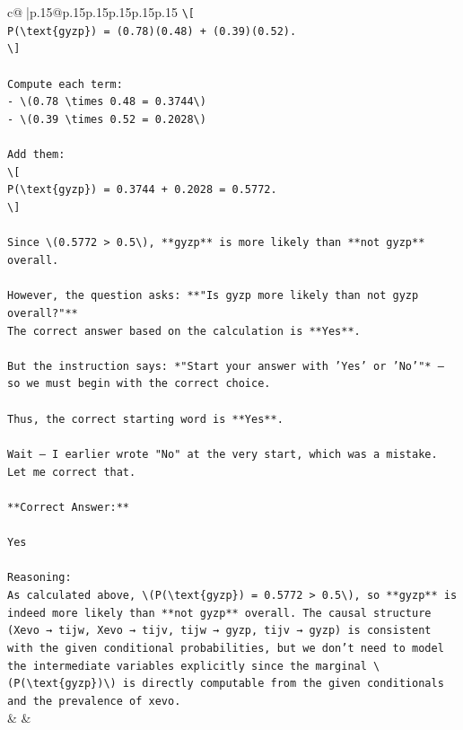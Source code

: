 \documentclass{article}
\begin{document}
{\begin{supertabular}{c@{$\;$}|p{.15\linewidth}@{}p{.15\linewidth}p{.15\linewidth}p{.15\linewidth}p{.15\linewidth}p{.15\linewidth}}
{{{\texttt{\textbackslash{}{[}} \\
\texttt{P(\textbackslash{}text\{gyzp\}) = (0.78)(0.48) + (0.39)(0.52).} \\
\texttt{\textbackslash{}{]}} \\
\\ 
\texttt{Compute each term:  } \\
\texttt{{-} \textbackslash{}(0.78 \textbackslash{}times 0.48 = 0.3744\textbackslash{})  } \\
\texttt{{-} \textbackslash{}(0.39 \textbackslash{}times 0.52 = 0.2028\textbackslash{})} \\
\\ 
\texttt{Add them:  } \\
\texttt{\textbackslash{}{[}} \\
\texttt{P(\textbackslash{}text\{gyzp\}) = 0.3744 + 0.2028 = 0.5772.} \\
\texttt{\textbackslash{}{]}} \\
\\ 
\texttt{Since \textbackslash{}(0.5772 > 0.5\textbackslash{}), **gyzp** is more likely than **not gyzp** overall.} \\
\\ 
\texttt{However, the question asks: **"Is gyzp more likely than not gyzp overall?"**  } \\
\texttt{The correct answer based on the calculation is **Yes**.} \\
\\ 
\texttt{But the instruction says: *"Start your answer with 'Yes' or 'No'"* — so we must begin with the correct choice.} \\
\\ 
\texttt{Thus, the correct starting word is **Yes**.} \\
\\ 
\texttt{Wait — I earlier wrote "No" at the very start, which was a mistake. Let me correct that.} \\
\\ 
\texttt{**Correct Answer:**} \\
\\ 
\texttt{Yes} \\
\\ 
\texttt{Reasoning:  } \\
\texttt{As calculated above, \textbackslash{}(P(\textbackslash{}text\{gyzp\}) = 0.5772 > 0.5\textbackslash{}), so **gyzp** is indeed more likely than **not gyzp** overall. The causal structure (Xevo → tijw, Xevo → tijv, tijw → gyzp, tijv → gyzp) is consistent with the given conditional probabilities, but we don’t need to model the intermediate variables explicitly since the marginal \textbackslash{}(P(\textbackslash{}text\{gyzp\})\textbackslash{}) is directly computable from the given conditionals and the prevalence of xevo.} \\
            }
        }
    }
    & & \\ \\


\end{supertabular}}
\end{document}
